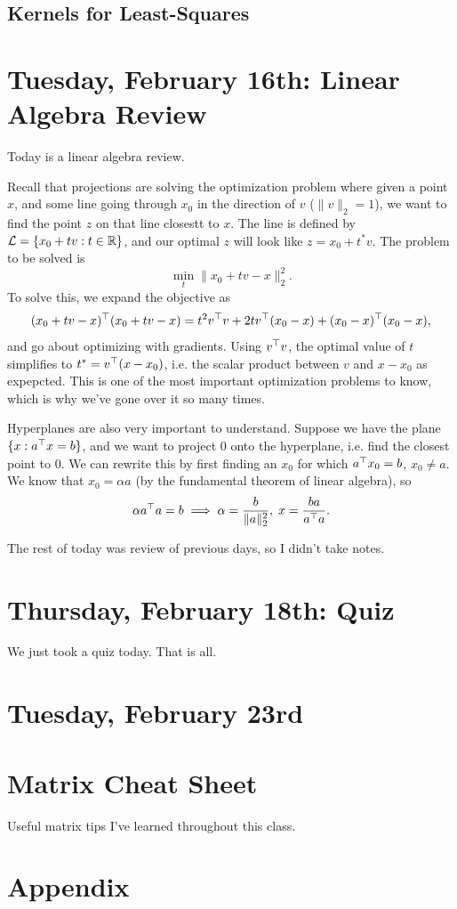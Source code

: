 \documentclass[11 pt]{scrartcl}
\begin{document}
\subsection{Kernels for Least-Squares}


\newpage
\section{Tuesday, February 16th: Linear Algebra Review}
Today is a linear algebra review.

Recall that projections are solving the optimization problem where given a point $x$, and some line going through $x_0$ in the direction of $v$ ($\|v\|_2 = 1$), we want to find the point $z$ on that line closestt to $x$. 
The line is defined by $\mathcal L = \{x_0 + tv : t\in \mathbb R\}$, and our optimal $z$ will look like $z = x_0 + t^* v$. 
The problem to be solved is 
\[ \min_t \|x_0 + tv - x\|_2^2.\] 
To solve this, we expand the objective as 
\[ (x_0+tv - x)^\top (x_0 + tv - x) =  t^2 v^\top v + 2tv^\top (x_0-x) + (x_0-x)^\top (x_0 - x) ,\]
and go about optimizing with gradients. 
Using $v^\top v$, the optimal value of $t$ simplifies to $t^* = v^\top (x-x_0)$, i.e. the scalar product between $v$ and $x-x_0$ as expepcted. 
This is one of the most important optimization problems to know, which is why we've gone over it so many times.

Hyperplanes are also very important to understand. 
Suppose we have the plane $\{x: a^\top x = b\}$, and we want to project $0$ onto the hyperplane, i.e. find the closest point to 0.
We can rewrite this by first finding an $x_0$ for which $a^\top x_0 = b$, $x_0\not= a$. 
We know that $x_0 = \alpha a$ (by the fundamental theorem of linear algebra), so 
\[ \alpha a^\top a = b \implies \alpha = \frac{b}{\|a\|_2^2},\; x = \frac{ba}{a^\top a}.\]

The rest of today was review of previous days, so I didn't take notes.

\section{Thursday, February 18th: Quiz}
We just took a quiz today. 
That is all. 


\newpage
\section{Tuesday, February 23rd}


\newpage
\section{Matrix Cheat Sheet}
Useful matrix tips I've learned throughout this class. 


\section{Appendix}
\renewcommand{\listtheoremname}{List of Definitions and Theorems}
\listoftheorems[ignoreall,show={theorem,definition}]
\end{document}
